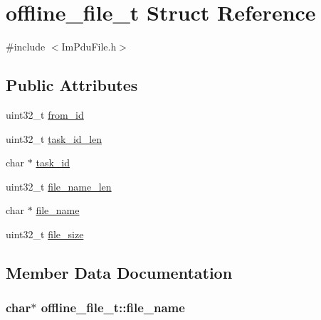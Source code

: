 \hypertarget{structoffline__file__t}{}\section{offline\+\_\+file\+\_\+t Struct Reference}
\label{structoffline__file__t}


{\ttfamily \#include $<$Im\+Pdu\+File.\+h$>$}

\subsection*{Public Attributes}
\begin{DoxyCompactItemize}
\item 
uint32\+\_\+t \hyperlink{structoffline__file__t_acdaf66c95fe804d347040f24b429540c}{from\+\_\+id}
\item 
uint32\+\_\+t \hyperlink{structoffline__file__t_aca2c92fcea23fc59df7dd19d2c6d9d23}{task\+\_\+id\+\_\+len}
\item 
char $\ast$ \hyperlink{structoffline__file__t_ad0d8722adc120b2d424535bd37106f15}{task\+\_\+id}
\item 
uint32\+\_\+t \hyperlink{structoffline__file__t_ae3360aff1f4fe416624071387af26bd9}{file\+\_\+name\+\_\+len}
\item 
char $\ast$ \hyperlink{structoffline__file__t_a1d473bb7a4a7883ebe9fa93926f1e320}{file\+\_\+name}
\item 
uint32\+\_\+t \hyperlink{structoffline__file__t_a214840ace918aea92989afeb7e02c8fe}{file\+\_\+size}
\end{DoxyCompactItemize}


\subsection{Member Data Documentation}
\hypertarget{structoffline__file__t_a1d473bb7a4a7883ebe9fa93926f1e320}{}
\subsubsection[{file\+\_\+name}]{\setlength{\rightskip}{0pt plus 5cm}char$\ast$ offline\+\_\+file\+\_\+t\+::file\+\_\+name}\label{structoffline__file__t_a1d473bb7a4a7883ebe9fa93926f1e320}
\hypertarget{structoffline__file__t_ae3360aff1f4fe416624071387af26bd9}{}
